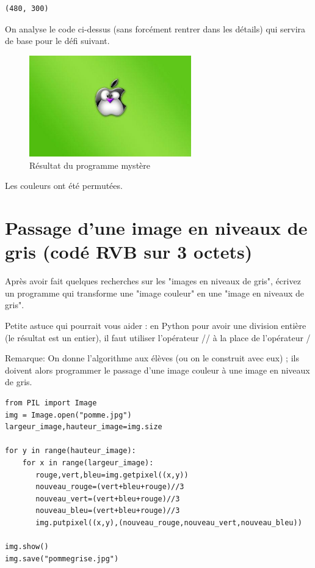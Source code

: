 \documentclass[11pt]{article}
\begin{document}
\begin{verbatim}
(480, 300)
\end{verbatim}


On analyse le code ci-dessus (sans forcément rentrer dans les détails) qui servira de base pour le défi suivant.

\begin{figure}[htbp]
\centering
\includegraphics[width=7cm]{pommeMystere.jpg}
\caption{Résultat du programme mystère}
\end{figure}

Les couleurs ont été permutées.


\section{Passage d'une image en niveaux de gris (codé RVB sur 3 octets)}
\label{sec:org8fb882e}

Après avoir fait quelques recherches sur les "images en niveaux de gris", écrivez un programme qui transforme une "image couleur" en une "image en niveaux de gris".

Petite astuce qui pourrait vous aider : en Python pour avoir une division entière (le résultat est un entier), il faut utiliser l'opérateur // à la place de l'opérateur / 

Remarque: On donne l'algorithme aux élèves (ou on le construit avec eux) ; ils doivent alors programmer le passage d'une image couleur à une image en niveaux de gris.


\begin{verbatim}
from PIL import Image
img = Image.open("pomme.jpg")
largeur_image,hauteur_image=img.size

for y in range(hauteur_image):
    for x in range(largeur_image):
       rouge,vert,bleu=img.getpixel((x,y))
       nouveau_rouge=(vert+bleu+rouge)//3
       nouveau_vert=(vert+bleu+rouge)//3
       nouveau_bleu=(vert+bleu+rouge)//3
       img.putpixel((x,y),(nouveau_rouge,nouveau_vert,nouveau_bleu))

img.show()
img.save("pommegrise.jpg")
\end{verbatim}
\end{document}
